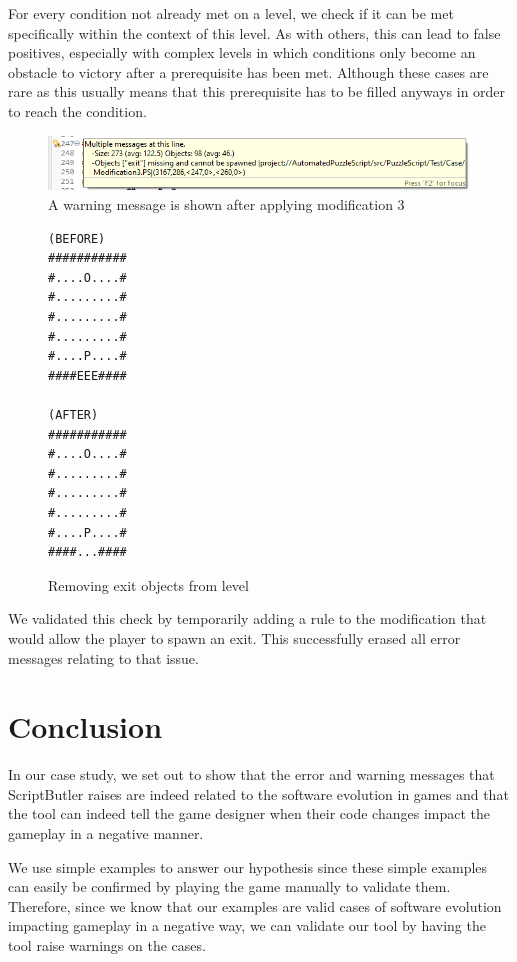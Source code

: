 For every condition not already met on a level, we check if it can be met specifically within the context of this level. As with others, this can lead to false positives, especially with complex levels in which conditions only become an obstacle to victory after a prerequisite has been met. Although these cases are rare as this usually means that this prerequisite has to be filled anyways in order to reach the condition. 

\begin{figure}[!t]
    \centering
    \includegraphics[width=1\textwidth]{images/case_results/Modification_3_Results.png}
    \caption{A warning message is shown after applying modification 3}
    \label{fig:modification_3_results_old}
\end{figure}

\begin{figure}[!t]
\begin{lstlisting}[language=PuzzleScript]
(BEFORE)
###########
#....O....#
#.........#
#.........#
#.........#
#....P....#
####EEE####

(AFTER)
###########
#....O....#
#.........#
#.........#
#.........#
#....P....#
####...####
\end{lstlisting}
\vspace*{-8pt}
\caption{Removing exit objects from level}
\label{fig:case_m3_modification_old}
\vspace*{-8pt}
\end{figure}

We validated this check by temporarily adding a rule to the modification that would allow the player to spawn an exit. This successfully erased all error messages relating to that issue.

\section{Conclusion}
In our case study, we set out to show that the error and warning messages that ScriptButler raises are indeed related to the software evolution in games and that the tool can indeed tell the game designer when their code changes impact the gameplay in a negative manner. 

We use simple examples to answer our hypothesis since these simple examples can easily be confirmed by playing the game manually to validate them. Therefore, since we know that our examples are valid cases of software evolution impacting gameplay in a negative way, we can validate our tool by having the tool raise warnings on the cases.

